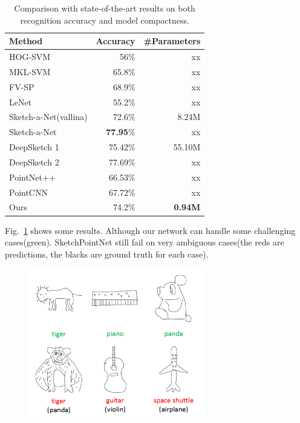 \begin{table}[htbp]
\centering
\caption{Comparison with state-of-the-art results on both recognition accuracy and model compactness.}
\label{tb:acc-size}
\begin{tabular}{l|rr}
    \hline
     Method & Accuracy & \#Parameters\\
    \hline
     HOG-SVM \cite{Eitz2012HowDH}& 56\% & xx \\
     MKL-SVM \cite{LiHSG15} & 65.8\%  & xx \\
     FV-SP \cite{Schneider2014SketchCA} & 68.9\%  & xx\\
     LeNet \cite{LeCun1998GradientbasedLA}& 55.2\%  & xx\\
     \hline
     Sketch-a-Net(vallina) \cite{Yu2015SketchaNetTB}& 72.6\% & 8.24M \\
     Sketch-a-Net \cite{Yu2015SketchaNetTB}& \textbf{77.95}\%  & xx\\
     DeepSketch 1 \cite{Seddati2015DeepSketchDC}& 75.42\%  & 55.10M\\
     DeepSketch 2 \cite{Dupont2016DeepSketch2D}& 77.69\%  & xx\\
     \hline
     PointNet++ \cite{qi2017pointnetplusplus}& 66.53\%  & xx\\
     PointCNN \cite{1801.07791}& 67.72\%  & xx\\
     Ours& 74.2\%  & \textbf{0.94M}\\
    \hline
\end{tabular}
\end{table}



Fig.~\ref{fig:resshow} shows some results. Although our network can handle some challenging cases(green). SketchPointNet still fail on very ambiguous cases(the reds are predictions, the blacks are ground truth for each case).

\begin{figure}[htbp]
    \center
    \includegraphics[width=3in]{images/res.png}
    \label{fig:resshow}
\end{figure}
